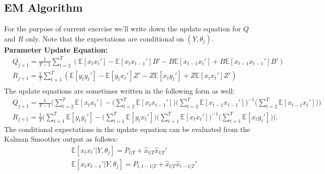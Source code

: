 \documentclass[12pt]{article}
\begin{document}
\subsection{EM Algorithm}
For the purpose of current exercise we'll write down the update equation for $Q$ and $R$ only. Note that the expectations are conditional on $(Y, \theta_j)$.\\
\textbf{Parameter Update Equation:}
\begin{align*}
& Q_{j+1} = \frac{1}{T-1} \sum_{t=2}^{T}(\mathbb{E}[x_tx_t'] - \mathbb{E}[x_t x_{t-1}']B' - B\mathbb{E}[x_{t-1} x_t' ] + B\mathbb{E}[x_{t-1}x_{t-1}']B')\\
& R_{j+1} = \frac{1}{T} \sum_{t=1}^{T}(\mathbb{E}[y_t y_t'] - \mathbb{E}[y_tx_t']Z' - Z\mathbb{E}[x_ty_t'] + Z \mathbb{E}[x_tx_t']Z') \\
\end{align*}
 The update equations are sometimes written in the following form as well:
\begin{align*}
& Q_{j+1} = \frac{1}{T-1} \Bigg( \sum_{t=2}^{T} \mathbb{E}[x_tx_t'] - \Big(\sum_{t=2}^{T} \mathbb{E}[x_tx_{t-1}']\Big) \Big(\sum_{t=2}^{T} \mathbb{E}[x_{t-1}x_{t-1}']\Big)^{-1}\Big(\sum_{t=2}^{T} \mathbb{E}[x_{t-1}x_t']\Big) \Bigg)\\
& R_{j+1} =\frac{1}{T}\Bigg( \sum_{t=1}^{T} \mathbb{E}[y_ty_t'] - \Big( \sum_{t=1}^{T} \mathbb{E}[y_tx_{t}']\Big)\Big(\sum_{t=1}^{T} \mathbb{E}[x_{t}x_{t}']\Big)^{-1}\Big(\sum_{t=1}^{T} \mathbb{E}[x_{t}y_t']\Big) \Bigg).
\end{align*}
The conditional expectations in the update equation can be evaluated from the Kalman Smoother output as follows:
\begin{align*}
& \mathbb{E}[x_tx_t'|Y, \theta_j] = P_{t|T} + \hat{x}_{t|T}\hat{x}_{t|T}' \\
& \mathbb{E}[x_tx_{t-1}'| Y, \theta_j] = P_{t, t-1|T} + \hat{x}_{t|T}\hat{x}_{t-1|T}'
\end{align*}
\end{document}
